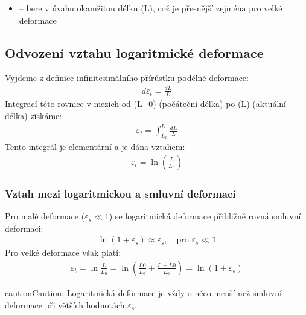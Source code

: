 \documentclass[letterpaper,10pt,english]{jupyterBook}
\begin{document}
{{\begin{itemize}
\item {} 
\sphinxAtStartPar
{} – bere v úvahu okamžitou délku (L), což je přesnější zejména pro velké deformace

\end{itemize}


\subsection{Odvození vztahu logaritmické deformace}
\label{\detokenize{Prednasky/2_6_In_u017een_xfdrsk_xe9_a_skute_u010dn_xe9_nap_u011bt_xed:odvozeni-vztahu-logaritmicke-deformace}}
\sphinxAtStartPar
Vyjdeme z definice infinitesimálního přírůstku podélné deformace:
\begin{equation*}
\begin{split}
d\varepsilon_t = \frac{dL}{L}
\end{split}
\end{equation*}
\sphinxAtStartPar
Integrací této rovnice v mezích od (L\_0) (počáteční délka) po (L) (aktuální délka) získáme:
\begin{equation*}
\begin{split}
\varepsilon_t = \int_{L_0}^{L} \frac{dL}{L}
\end{split}
\end{equation*}
\sphinxAtStartPar
Tento integrál je elementární a  je dána vztahem:
\begin{equation*}
\begin{split}
\varepsilon_t = \ln{\left( \frac{L}{L_0} \right)}
\end{split}
\end{equation*}

\subsubsection{Vztah mezi logaritmickou a smluvní deformací}
\label{\detokenize{Prednasky/2_6_In_u017een_xfdrsk_xe9_a_skute_u010dn_xe9_nap_u011bt_xed:vztah-mezi-logaritmickou-a-smluvni-deformaci}}
\sphinxAtStartPar
Pro malé deformace (\(\varepsilon_s \ll 1\)) se logaritmická deformace přibližně rovná smluvní deformaci:
\begin{equation*}
\begin{split}
\ln(1 + \varepsilon_s) \approx \varepsilon_s, \quad \text{pro } \varepsilon_s \ll 1
\end{split}
\end{equation*}
\sphinxAtStartPar
Pro velké deformace však platí:
\begin{equation*}
\begin{split}
\varepsilon_t = \ln{\frac{L}{L_0}} = \ln\left({\frac{L0}{L_0} + \frac{L-L0}{L_0}}\right) =  \ln(1 + \varepsilon_s)
\end{split}
\end{equation*}
\begin{sphinxadmonition}{caution}{Caution:}
\sphinxAtStartPar
Logaritmická deformace je vždy o něco menší než smluvní deformace při větších hodnotách \(\varepsilon_s\).
\end{sphinxadmonition}

}}
\end{document}

